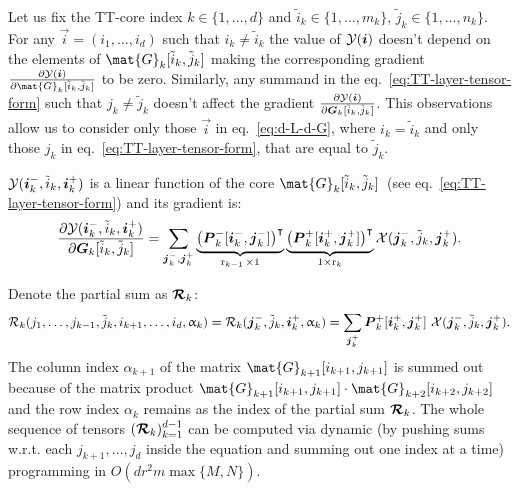 Let us fix the TT-core index $k \in \{1, \dots, d\}$ and $\tilde{i}_k \in \{1, \dots, m_k\}$, $\tilde{j}_k \in \{1, \dots, n_k\}$.
For any $\vec{i} = (i_1, \dots, i_d)$ such that $i_k \neq \tilde{i}_k$ the value of $\mathcal{Y}(\boldsymbol{i})$ doesn't depend on the elements of $\mat{G}_k[\tilde{i}_k, \tilde{j}_k]$ making the corresponding gradient $\frac{\partial \tensel{Y}(\vec{i})}{\partial \mat{G}_k[\tilde{i}_k, \tilde{j}_k]}$ to be zero. Similarly, any summand in the eq.~\ref{eq:TT-layer-tensor-form} such that $j_k \neq \tilde{j}_k$ doesn't affect the gradient $\frac{\partial{\mathcal{Y}}(\boldsymbol{i})}{\partial{\boldsymbol{G}_k[\tilde{i}_k, \tilde{j}_k]}}$. This observations allow us to consider only those $\vec{i}$ in eq.~\ref{eq:d-L-d-G}, where $i_k = \tilde{i}_k$ and only those $j_k$ in eq.~\ref{eq:TT-layer-tensor-form}, that are equal to $\tilde{j}_k$.

$\mathcal{Y}(\boldsymbol{i}_k^-, \tilde{i}_k, \boldsymbol{i}_k^+)$ is a linear function of the core $\mat{G}_k[\tilde{i}_k, \tilde{j}_k]$~(see eq.~\ref{eq:TT-layer-tensor-form}) and its gradient is:
\begin{align*}
\frac{\partial{\mathcal{Y}(\boldsymbol{i}_k^-, \tilde{i}_k, \boldsymbol{i}_k^+)}}{\partial{\boldsymbol{G}_k[\tilde{i}_k, \tilde{j}_k]}} = \sum_{\boldsymbol{j}_k^-, \boldsymbol{j}_k^+} \underbrace{\left ( \boldsymbol{P}_k^-[\boldsymbol{i}_k^-, \boldsymbol{j}_k^-] \right )^\intercal }_{\operatorname{r}_{k-1} \times 1}  \underbrace{\left (\boldsymbol{P}_k^+[\boldsymbol{i}_k^+, \boldsymbol{j}_k^+] \right )^\intercal}_{1 \times \operatorname{r}_{k}} \mathcal{X}(\boldsymbol{j}_k^-, \tilde{j}_k, \boldsymbol{j}_k^+).
\end{align*}

Denote the partial sum as $\boldsymbol{\mathcal{R}}_{k}$:
\begin{align*}
\mathcal{R}_{k}(j_1, \dots, j_{k-1}, \tilde{j}_k, i_{k+1}, \dots, i_d, \upalpha_{k}) = \mathcal{R}_{k}(\boldsymbol{j}_{k}^-, \tilde{j}_k, \boldsymbol{i}_k^+, \upalpha_{k}) = \sum_{\boldsymbol{j}_k^+} \boldsymbol{P}_k^+[\boldsymbol{i}_k^+, \boldsymbol{j}_k^+] ~ \mathcal{X}(\boldsymbol{j}_k^-, \tilde{j}_k, \boldsymbol{j}_k^+).
\end{align*}
The column index $\alpha_{k+1}$ of the matrix $\mat{G}_{k+1}[i_{k+1}, j_{k+1}]$ is summed out because of the matrix product $\mat{G}_{k+1}[i_{k+1}, j_{k+1}] \cdot \mat{G}_{k+2}[i_{k+2}, j_{k+2}]$ and the row index $\alpha_{k}$ remains as the index of the partial sum $\boldsymbol{\mathcal{\boldsymbol{\mathcal{R}}}}_{k}$. The whole sequence of tensors $(\boldsymbol{\mathcal{\boldsymbol{\mathcal{R}}}}_{k})_{k = 1}^{d-1}$ can be computed via dynamic (by pushing sums w.r.t. each $j_{k+1}, \ldots, j_d$ inside the equation and summing out one index at a time) programming in $O(d r^2 m \max\{M, N\})$.

